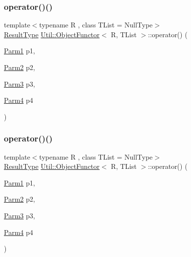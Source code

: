 \subsubsection{\texorpdfstring{operator()()}{operator()()}\hspace{0.1cm}{\footnotesize\ttfamily [13/18]}}
{\footnotesize\ttfamily template$<$typename R , class T\+List  = Null\+Type$>$ \\
\mbox{\hyperlink{classUtil_1_1ObjectFunctor_a77f816e98108848347d0dfc085090a1c}{Result\+Type}} \mbox{\hyperlink{classUtil_1_1ObjectFunctor}{Util\+::\+Object\+Functor}}$<$ R, T\+List $>$\+::operator() (\begin{DoxyParamCaption}\item[{\mbox{\hyperlink{classUtil_1_1ObjectFunctor_a199715d28029627c2ae7219c13b04d26}{Parm1}}}]{p1,  }\item[{\mbox{\hyperlink{classUtil_1_1ObjectFunctor_a6809cf65883dc7575e01d9b9849649cf}{Parm2}}}]{p2,  }\item[{\mbox{\hyperlink{classUtil_1_1ObjectFunctor_a6becd26610c6091b9ba93cd96f3def66}{Parm3}}}]{p3,  }\item[{\mbox{\hyperlink{classUtil_1_1ObjectFunctor_a54ce0b64981cd7f558ce8eea7df3f1b2}{Parm4}}}]{p4 }\end{DoxyParamCaption})\hspace{0.3cm}{\ttfamily [inline]}}

\mbox{\label{classUtil_1_1ObjectFunctor_a87c6264782e6c535c3a66f385d922f12}} 
\subsubsection{\texorpdfstring{operator()()}{operator()()}\hspace{0.1cm}{\footnotesize\ttfamily [14/18]}}
{\footnotesize\ttfamily template$<$typename R , class T\+List  = Null\+Type$>$ \\
\mbox{\hyperlink{classUtil_1_1ObjectFunctor_a77f816e98108848347d0dfc085090a1c}{Result\+Type}} \mbox{\hyperlink{classUtil_1_1ObjectFunctor}{Util\+::\+Object\+Functor}}$<$ R, T\+List $>$\+::operator() (\begin{DoxyParamCaption}\item[{\mbox{\hyperlink{classUtil_1_1ObjectFunctor_a199715d28029627c2ae7219c13b04d26}{Parm1}}}]{p1,  }\item[{\mbox{\hyperlink{classUtil_1_1ObjectFunctor_a6809cf65883dc7575e01d9b9849649cf}{Parm2}}}]{p2,  }\item[{\mbox{\hyperlink{classUtil_1_1ObjectFunctor_a6becd26610c6091b9ba93cd96f3def66}{Parm3}}}]{p3,  }\item[{\mbox{\hyperlink{classUtil_1_1ObjectFunctor_a54ce0b64981cd7f558ce8eea7df3f1b2}{Parm4}}}]{p4 }\end{DoxyParamCaption})\hspace{0.3cm}{\ttfamily [inline]}}

